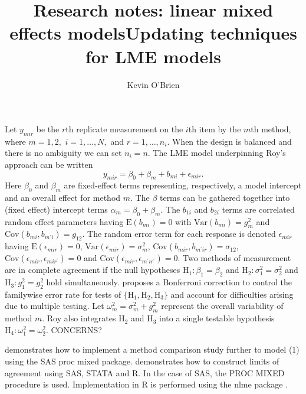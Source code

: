 \documentclass[12pt, a4paper]{article}
\title{Research notes: linear mixed effects models}
\author{ } \date{ }
\theoremstyle{plain}
\theoremstyle{definition}
\theoremstyle{remark}
\begin{document}
\author{Kevin O'Brien}
\title{Updating techniques for LME models}




Let $y_{mir} $ be the $r$th replicate measurement on the $i$th item by the $m$th method, where $m=1,2,$ $i=1,\ldots,N,$ and $r = 1,\ldots,n_i.$ When the design is balanced and there is no ambiguity we can set $n_i=n.$ The LME model underpinning Roy's approach can be written
\begin{equation}
y_{mir} = \beta_{0} + \beta_{m} + b_{mi} + \epsilon_{mir}.
\end{equation}
Here $\beta_0$ and $\beta_m$ are fixed-effect terms representing, respectively, a model intercept and an overall effect for method $m.$
The $\beta$ terms can be gathered together into (fixed effect) intercept terms $\alpha_m=\beta_0+\beta_m.$ The $b_{1i}$ and $b_{2i}$ terms are correlated random effect parameters having $\mathrm{E}(b_{mi})=0$ with $\mathrm{Var}(b_{mi})=g^2_m$ and $\mathrm{Cov}(b_{mi}, b_{m^\prime i})=g_{12}.$ The random error term for each response is denoted $\epsilon_{mir}$ having $\mathrm{E}(\epsilon_{mir})=0$, $\mathrm{Var}(\epsilon_{mir})=\sigma^2_m$, $\mathrm{Cov}(b_{mir}, b_{m^\prime ir})=\sigma_{12}$, $\mathrm{Cov}(\epsilon_{mir}, \epsilon_{mir^\prime})= 0$ and $\mathrm{Cov}(\epsilon_{mir}, \epsilon_{m^\prime ir^\prime})= 0.$ Two methods of measurement are in complete agreement if the null hypotheses $\mathrm{H}_1\colon \beta_1 = \beta_2$ and $\mathrm{H}_2\colon \sigma^2_1 = \sigma^2_2 $ and $\mathrm{H}_3\colon g^2_1= g^2_2$ hold simultaneously. \citet{roy} proposes a Bonferroni correction to control the familywise error rate for tests of $\{\mathrm{H}_1, \mathrm{H}_2, \mathrm{H}_3\}$ and account for difficulties arising due to multiple testing. Let $\omega^2_m = \sigma^2_m + g^2_m$ represent the overall variability of method $m.$  Roy also integrates $\mathrm{H}_2$ and $\mathrm{H}_3$ into a single testable hypothesis $\mathrm{H}_4\colon \omega^2_1=\omega^2_2.$ CONCERNS?

\bigskip

\citet{Roy} demonstrates how to implement a method comparison study further to model (1) using the SAS proc mixed package.
\citet{BXC2008} demonstrates how to construct limits of agreement using SAS, STATA and R. In the case of SAS, the PROC MIXED procedure is used.
Implementation in R is performed using the nlme package \citep{pb2000}.
\end{document}
